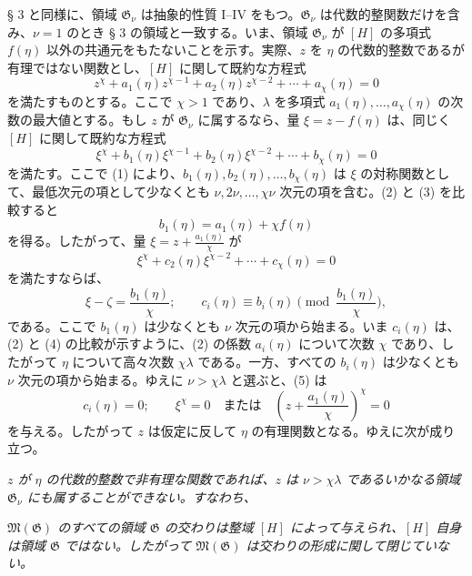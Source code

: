 \documentclass[11pt]{article}
\begin{document}
§ 3 と同様に、領域 $\mathfrak G_\nu$ は抽象的性質 I--IV をもつ。$\mathfrak G_\nu$ は代数的整関数だけを含み、$\nu=1$ のとき § 3 の領域と一致する。いま、領域 $\mathfrak G_\nu$ が $[H]$ の多項式 $f(\eta)$ 以外の共通元をもたないことを示す。実際、$z$ を $\eta$ の代数的整数であるが有理ではない関数とし、$[H]$ に関して既約な方程式
\begin{equation}
z^\chi+a_1(\eta)z^{\chi-1}+a_2(\eta)z^{\chi-2}+\cdots+a_\chi(\eta)=0
\tag{2}
\end{equation}
を満たすものとする。ここで $\chi>1$ であり、$\lambda$ を多項式 $a_1(\eta),\ldots,a_\chi(\eta)$ の次数の最大値とする。もし $z$ が $\mathfrak G_\nu$ に属するなら、量 $\xi=z-f(\eta)$ は、同じく $[H]$ に関して既約な方程式
\begin{equation}
\xi^\chi+b_1(\eta)\xi^{\chi-1}+b_2(\eta)\xi^{\chi-2}+\cdots+b_\chi(\eta)=0
\tag{3}
\end{equation}
を満たす。ここで (1) により、$b_1(\eta),b_2(\eta),\ldots,b_\chi(\eta)$ は $\xi$ の対称関数として、最低次元の項として少なくとも $\nu,2\nu,\ldots,\chi\nu$ 次元の項を含む。(2) と (3) を比較すると
\[
 b_1(\eta)=a_1(\eta)+\chi f(\eta)
\]
を得る。したがって、量 $\xi=z+\frac{a_1(\eta)}{\chi}$ が
\begin{equation}
\xi^\chi+c_2(\eta)\xi^{\chi-2}+\cdots+c_\chi(\eta)=0
\tag{4}
\end{equation}
を満たすならば、
\begin{equation}
 \xi-\zeta=\frac{b_1(\eta)}{\chi};
 \qquad
 c_i(\eta)\equiv b_i(\eta)\pmod{\frac{b_1(\eta)}{\chi}},
\tag{5}
\end{equation}
である。ここで $b_1(\eta)$ は少なくとも $\nu$ 次元の項から始まる。いま $c_i(\eta)$ は、(2) と (4) の比較が示すように、(2) の係数 $a_i(\eta)$ について次数 $\chi$ であり、したがって $\eta$ について高々次数 $\chi\lambda$ である。一方、すべての $b_i(\eta)$ は少なくとも $\nu$ 次元の項から始まる。ゆえに $\nu>\chi\lambda$ と選ぶと、(5) は
\[
 c_i(\eta)=0;\qquad
 \xi^\chi=0\quad\text{または}\quad
 \left(z+\frac{a_1(\eta)}{\chi}\right)^\chi=0
\]
を与える。したがって $z$ は仮定に反して $\eta$ の有理関数となる。ゆえに次が成り立つ。

\emph{$z$ が $\eta$ の代数的整数で非有理な関数であれば、$z$ は $\nu>\chi\lambda$ であるいかなる領域 $\mathfrak G_\nu$ にも属することができない。すなわち、}

\emph{$\mathfrak M(\mathfrak G)$ のすべての領域 $\mathfrak G$ の交わりは整域 $[H]$ によって与えられ、$[H]$ 自身は領域 $\mathfrak G$ ではない。したがって $\mathfrak M(\mathfrak G)$ は交わりの形成に関して閉じていない。}
\end{document}
